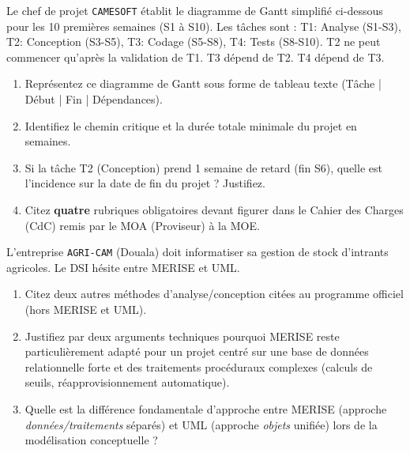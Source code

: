 \documentclass[11pt]{article}
\begin{document}
\begin{exercice}
Le chef de projet \texttt{CAMESOFT} établit le diagramme de Gantt simplifié ci-dessous pour les 10 premières semaines (S1 à S10). Les tâches sont : T1: Analyse (S1-S3), T2: Conception (S3-S5), T3: Codage (S5-S8), T4: Tests (S8-S10). T2 ne peut commencer qu'après la validation de T1. T3 dépend de T2. T4 dépend de T3.
\begin{enumerate}
    \item Représentez ce diagramme de Gantt sous forme de tableau texte (Tâche | Début | Fin | Dépendances).
    \item Identifiez le chemin critique et la durée totale minimale du projet en semaines.
    \item Si la tâche T2 (Conception) prend 1 semaine de retard (fin S6), quelle est l'incidence sur la date de fin du projet ? Justifiez.
    \item Citez \textbf{quatre} rubriques obligatoires devant figurer dans le Cahier des Charges (CdC) remis par le MOA (Proviseur) à la MOE.
\end{enumerate}
\end{exercice}

\begin{exercice}
L'entreprise \texttt{AGRI-CAM} (Douala) doit informatiser sa gestion de stock d'intrants agricoles. Le DSI hésite entre MERISE et UML.
\begin{enumerate}
    \item Citez deux autres méthodes d'analyse/conception citées au programme officiel (hors MERISE et UML).
    \item Justifiez par deux arguments techniques pourquoi MERISE reste particulièrement adapté pour un projet centré sur une base de données relationnelle forte et des traitements procéduraux complexes (calculs de seuils, réapprovisionnement automatique).
    \item Quelle est la différence fondamentale d'approche entre MERISE (approche \textit{données/traitements} séparés) et UML (approche \textit{objets} unifiée) lors de la modélisation conceptuelle ?
\end{enumerate}
\end{exercice}
\end{document}
